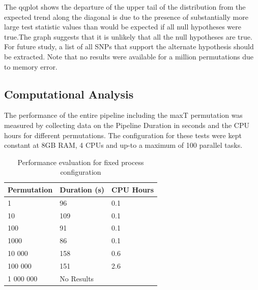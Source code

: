 \documentclass[12pt]{article}
\begin{document}
The qqplot shows the departure of the upper tail of the distribution from the expected trend along the diagonal is due to the presence of substantially more large test statistic values than would be expected if all null hypotheses were true.The graph suggests that it is unlikely that all the null hypotheses are true. For future study, a list of all SNPs that support the alternate hypothesis should be extracted. Note that no results were available for a million permutations due to memory error.

\subsection{Computational Analysis}
The performance of the entire pipeline including the maxT permutation was measured by collecting data on the Pipeline Duration in seconds and the CPU hours for different permutations. The configuration for these tests were kept constant at 8GB RAM, 4 CPUs and up-to a maximum of 100 parallel tasks.

\begin{table}[h!]
\centering
\begin{tabular}{|l|l|l|} 
\hline
Permutation & Duration (s) & CPU Hours          \\ 
\hline
1           & 96           & 0.1                \\ 
\hline
10          & 109          & 0.1                \\ 
\hline
100         & 91           & 0.1                \\ 
\hline
1000        & 86           & 0.1                \\ 
\hline
10 000      & 158          & 0.6                \\ 
\hline
100 000     & 151          & 2.6                \\ 
\hline
1 000 000   & \multicolumn{2}{l|}{ No Results}  \\
\hline
\end{tabular}
\caption{Performance evaluation for fixed process configuration}
\end{table}

\newpage



\end{document}
